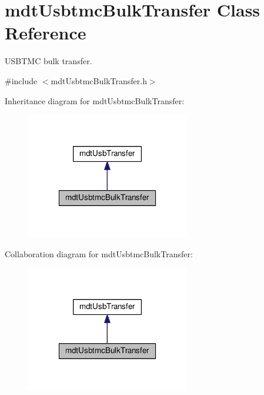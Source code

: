 \hypertarget{classmdt_usbtmc_bulk_transfer}{\section{mdt\-Usbtmc\-Bulk\-Transfer Class Reference}
\label{classmdt_usbtmc_bulk_transfer}
}


U\-S\-B\-T\-M\-C bulk transfer.  




{\ttfamily \#include $<$mdt\-Usbtmc\-Bulk\-Transfer.\-h$>$}



Inheritance diagram for mdt\-Usbtmc\-Bulk\-Transfer\-:\nopagebreak
\begin{figure}[H]
\begin{center}
\leavevmode
\includegraphics[width=202pt]{classmdt_usbtmc_bulk_transfer__inherit__graph}
\end{center}
\end{figure}


Collaboration diagram for mdt\-Usbtmc\-Bulk\-Transfer\-:\nopagebreak
\begin{figure}[H]
\begin{center}
\leavevmode
\includegraphics[width=202pt]{classmdt_usbtmc_bulk_transfer__coll__graph}
\end{center}
\end{figure}
